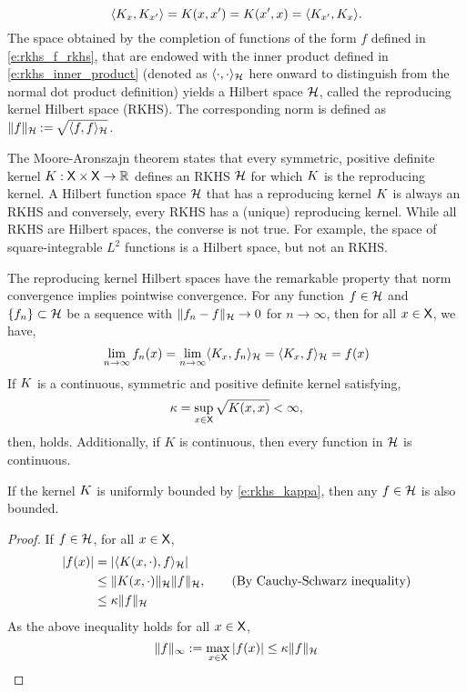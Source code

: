 \begin{equation}
\langle K_x, K_{x'} \rangle =  K(x,x') = K(x',x) =  \langle K_{x'}, K_x \rangle. 
\end{equation}
The space obtained by the completion of functions of the form $f$ defined in \eqref{e:rkhs_f_rkhs}, that are endowed with the inner product defined in \eqref{e:rkhs_inner_product} (denoted as $\langle \cdot, \cdot \rangle_{{\cal H}}$ here onward to distinguish from the normal dot product definition) yields a Hilbert space ${\cal H}$, called the reproducing kernel Hilbert space (RKHS). The corresponding norm is defined as $\|f\|_{\cal H} \mathbin{:=} \sqrt{\langle f, f \rangle_{\cal H}}$. 

The Moore-Aronszajn theorem states that every symmetric, positive definite kernel $K : {\sf X} \times {\sf X} \to \mathbb{R}$ defines an RKHS ${\cal H}$ for which $K$ is the reproducing kernel. A Hilbert function space ${\cal H}$ that has a reproducing kernel $K$ is always an RKHS and conversely, every RKHS has a (unique) reproducing kernel. While all RKHS are Hilbert spaces, the converse is not true. For example, the space of square-integrable $L^2$ functions is a Hilbert space, but not an RKHS. 

The reproducing kernel Hilbert spaces have the remarkable property that norm convergence implies pointwise convergence. 
For any function $f\in{\cal H}$ and $\{f_n\}\subset {\cal H}$ be a sequence with $\|f_n - f\|_{\cal H} \to 0$ for $n \to \infty$, then for all $x \in {\sf X}$, we have,
\begin{equation}
\lim_{n\to\infty} f_n(x) = \lim_{n \to \infty} \langle K_x,  f_n \rangle_{\cal H} = \langle K_x, f \rangle_{\cal H} = f(x)
\end{equation}
If $K$ is a continuous, symmetric and positive definite kernel satisfying, 
\begin{equation}
\kappa = \sup_{x \in \state} \sqrt{\Kern(x,x)} < \infty,
\label{e:rkhs_kappa}
\end{equation}
then,  holds. Additionally, if $K$ is continuous, then every function in ${\cal H}$ is continuous. 
\begin{proposition}
\label{prop:RKHS_bounded}
	If the kernel $K$ is uniformly bounded by \eqref{e:rkhs_kappa}, then any $f \in {\cal H}$ is also bounded. 
\end{proposition}
\begin{proof}
	If $f \in {\cal H}$, for all $x \in {\sf X}$,
	\begin{equation}
	\begin{aligned}
	|f(x)| &= |\langle K(x,\cdot), f \rangle_{\cal H}| \\
	& \leq \|K(x,\cdot)\|_{\cal H} \|f\|_{\cal H}, \qquad{\text{(By Cauchy-Schwarz inequality)}}\\ 
	& \leq \kappa \|f\|_{\cal H}
	\end{aligned}
	\end{equation}
	As the above inequality holds for all $x \in {\sf X}$, 
	\begin{equation}
	\|f\|_\infty := \max_{x\in {\sf X}}|f(x)| \leq \kappa \|f\|_{\cal H}
	\end{equation}
\end{proof}


